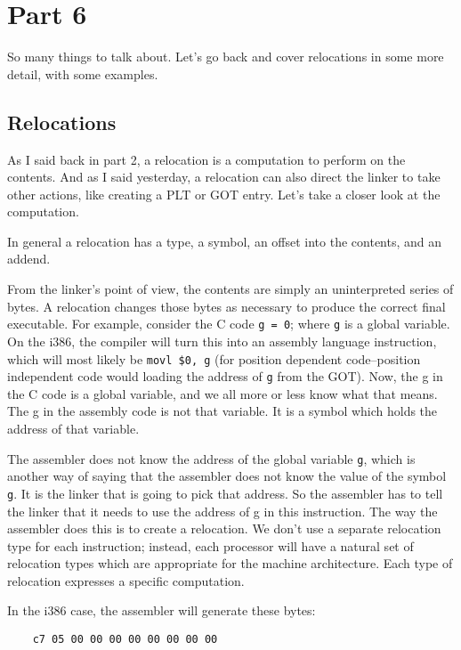 \section{Part 6}
So many things to talk about. Let's go back and cover relocations in some more
detail, with some examples.

\subsection{Relocations}

As I said back in part 2, a relocation is a computation to perform on the
contents. And as I said yesterday, a relocation can also direct the linker to
take other actions, like creating a PLT or GOT entry. Let's take a closer look
at the computation.

In general a relocation has a type, a symbol, an offset into the contents, and
an addend.

From the linker's point of view, the contents are simply an uninterpreted
series of bytes. A relocation changes those bytes as necessary to produce the
correct final executable. For example, consider the C code \texttt{g = 0};
where \texttt{g} is a global variable. On the i386, the compiler will turn this
into an assembly language instruction, which will most likely be \texttt{movl
\$0, g} (for position dependent code--position independent code would loading
the address of \texttt{g} from the GOT). Now, the g in the C code is a global
variable, and we all more or less know what that means. The g in the assembly
code is not that variable. It is a symbol which holds the address of that
variable.

The assembler does not know the address of the global variable \texttt{g},
which is another way of saying that the assembler does not know the value of
the symbol \texttt{g}. It is the linker that is going to pick that address. So
the assembler has to tell the linker that it needs to use the address of g in
this instruction. The way the assembler does this is to create a relocation.
We don't use a separate relocation type for each instruction; instead, each
processor will have a natural set of relocation types which are appropriate
for the machine architecture. Each type of relocation expresses a specific
computation.

In the i386 case, the assembler will generate these bytes:

\begin{verbatim}
    c7 05 00 00 00 00 00 00 00 00
\end{verbatim}

